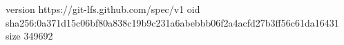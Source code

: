 version https://git-lfs.github.com/spec/v1
oid sha256:0a371d15c06bf80a838c19b9c231a6abebbb06f2a4acfd27b3ff56c61da16431
size 349692
